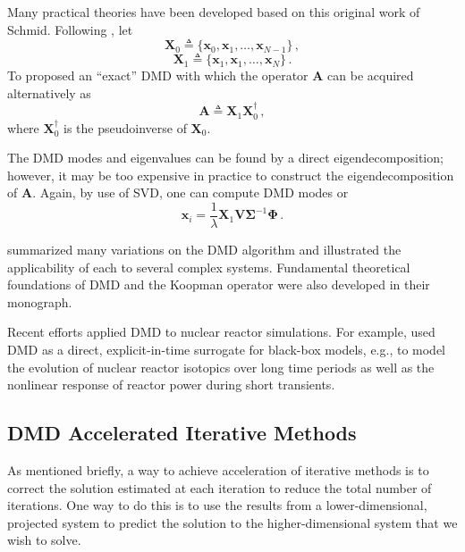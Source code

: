 Many practical theories have been developed based on this original work of Schmid.
Following \citet{tu_dynamic_2014}\cite{tu_tus_2014}, let 
\begin{equation}
 \mathbf{X}_0 \triangleq \{\mathbf{x}_0, \mathbf{x}_1, \ldots, \mathbf{x}_{N-1} \}\, ,
 \label{eq:x1}
\end{equation}
\begin{equation}
 \mathbf{X}_1 \triangleq \{\mathbf{x}_1, \mathbf{x}_1, \ldots, \mathbf{x}_{N} \} \, .
 \label{eq:x2}
\end{equation}
To proposed an ``exact'' DMD with which the operator $\mathbf{A}$ can be acquired alternatively as   
\begin{equation}
 \mathbf{A}\triangleq \mathbf{X}_1  \mathbf{X}_0^{\dagger}\, ,
 \label{eq:exact_dmd}
\end{equation}
where $\mathbf{X}_0^{\dagger}$ is the pseudoinverse of $\mathbf{X}_0$. 

The DMD modes and eigenvalues can be found by a direct eigendecomposition; however, it may be too expensive in practice to construct the eigendecomposition of $\mathbf{A}$.
Again, by use of SVD, one can compute DMD modes  or
\begin{equation}
 \mathbf{\mathbf{x}}_i = \frac{1}{\lambda} \mathbf{X}_1 \mathbf{V} \mathbf{\Sigma}^{-1} \mathbf{\Phi} \, .
 \label{eq:exact_dmd_free}
\end{equation}
 
\citet{kutz_dynamic_2016} summarized many variations on the DMD algorithm and illustrated the applicability of each to several complex systems.
Fundamental theoretical foundations of DMD and the Koopman operator were also developed in their monograph.

Recent efforts applied DMD to nuclear reactor simulations. 
For example, \citet{abdo_data-driven_2018} used DMD as a direct, explicit-in-time surrogate for black-box models, e.g., to model the evolution of nuclear reactor isotopics over long time periods as well as the nonlinear response of reactor power during short transients.\cite{abdo_modeling_2019}\cite{elzohery2018comparison}

\subsection{DMD Accelerated Iterative Methods}
As mentioned briefly, a way to achieve acceleration of iterative methods is to correct the solution estimated at each iteration to reduce the total number of iterations.
One way to do this is to use the results from a lower-dimensional, projected system to predict the solution to the higher-dimensional system that we wish to solve.


